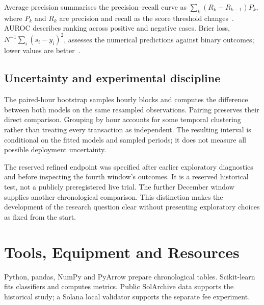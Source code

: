 \documentclass[12pt,a4paper,oneside]{report}
\begin{document}
Average precision summarises the precision--recall curve as $\sum_k(R_k-R_{k-1})P_k$, where $P_k$ and $R_k$ are precision and recall as the score threshold changes~\cite{ap}. AUROC describes ranking across positive and negative cases. Brier loss, $N^{-1}\sum_i(s_i-y_i)^2$, assesses the numerical predictions against binary outcomes; lower values are better~\cite{brier}.
\subsection{Uncertainty and experimental discipline}
The paired-hour bootstrap samples hourly blocks and computes the difference between both models on the same resampled observations. Pairing preserves their direct comparison. Grouping by hour accounts for some temporal clustering rather than treating every transaction as independent. The resulting interval is conditional on the fitted models and sampled periods; it does not measure all possible deployment uncertainty.

The reserved refined endpoint was specified after earlier exploratory diagnostics and before inspecting the fourth window's outcomes. It is a reserved historical test, not a publicly preregistered live trial. The further December window supplies another chronological comparison. This distinction makes the development of the research question clear without presenting exploratory choices as fixed from the start.

\section{Tools, Equipment and Resources}
Python, pandas, NumPy and PyArrow prepare chronological tables. Scikit-learn fits classifiers and computes metrics. Public SolArchive data supports the historical study; a Solana local validator supports the separate fee experiment.
\end{document}
